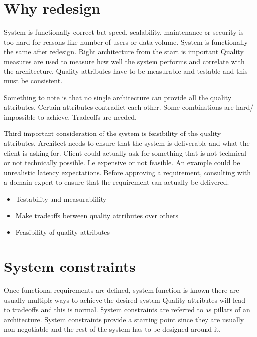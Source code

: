 \documentclass[a4paper, 11pt]{book}
\begin{document}
    \section{Why redesign}
    System is functionally correct but speed, scalability, maintenance or security is too hard for reasons like number of users or data volume.
    System is functionally the same after redesign.
    Right architecture from the start is important
    Quality measures are used to measure how well the system performs and correlate with the architecture.
    Quality attributes have to be measurable and testable and this must be consistent.

    Something to note is that no single architecture can provide all the quality attributes. Certain attributes contradict each other.
    Some combinations are hard/ impossible to achieve.
    Tradeoffs are needed.

    Third important consideration of the system is feasibility of the quality attributes.
    Architect needs to ensure that the system is deliverable and what the client is asking for.
    Client could actually ask for something that is not technical or not technically possible.
    I.e expensive or not feasible.
    An example could be unrealistic latency expectations.
    Before approving a requirement, consulting with a domain expert to ensure that the requirement can actually be delivered.

    \begin{itemize}
        \item Testability and measurablility
        \item Make tradeoffs between quality attributes over others
        \item Feasibility of quality attributes
    \end{itemize}


    \section{System constraints}
    Once functional requirements are defined, system function is known there are usually multiple ways to achieve the desired system
    Quality attributes will lead to tradeoffs and this is normal.
    System constraints are referred to as pillars of an architecture.
    System constraints provide a starting point since they are usually non-negotiable and the rest of the system has to be designed around it.
\end{document}
